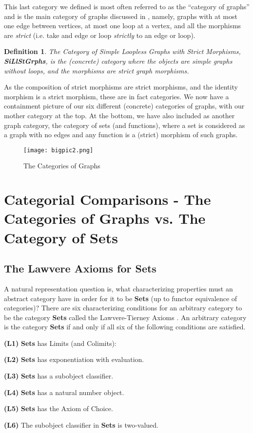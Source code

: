 \documentclass[11pt]{article}
\newtheorem{definition}[theorem]{Definition}
\begin{document}
\indent This last category we defined is most often referred to as the ``category of graphs'' and is the main category of graphs discussed in \cites{HN2004, Dochtermann}, namely, graphs with at most one edge between vertices, at most one loop at a vertex, and all the morphisms are \emph{strict} (i.e. take and edge or loop \emph{strictly} to an edge or loop).
\begin{definition}
The \emph{Category of Simple Loopless Graphs with Strict Morphisms}, \textbf{SiLlStGrphs}, is the (concrete) category where the objects are simple graphs without loops, and the morphisms are strict graph morphisms.
\end{definition}
As the composition of strict morphisms are strict morphisms, and the identity morphism is a strict morphism, these are in fact categories. We now have a containment picture of our six different (concrete) categories of graphs, with our mother category at the top. At the bottom, we have also included as another graph category, the category of sets (and functions), where a set is considered as a graph with no edges and any function is a (strict) morphism of such graphs.
\begin{figure}[h]
\centering \texttt{[image: bigpic2.png]}
\caption{The Categories of Graphs}
\end{figure}

\section[Categorial Comparisons - Graphs vs. Sets]{Categorial Comparisons - The Categories of Graphs vs. The Category of Sets}
\subsection{The Lawvere Axioms for \textbf{Sets}}
A natural representation question is, what characterizing properties must an abstract category have in order for it to be \textbf{Sets} (up to functor equivalence of categories)? There are six characterizing conditions for an arbitrary category to be the category \textbf{Sets} called the Lawvere-Tierney Axioms \cites{LT, Lawvere, T}. An arbitrary category is the category \textbf{Sets} if and only if all six of the following conditions are satisfied.\par
\begin{list}{}
\item \textbf{(L1)} \textbf{Sets} has Limits (and Colimits):
\item \textbf{(L2)} \textbf{Sets} has exponentiation with evaluation.
\item \textbf{(L3)} \textbf{Sets} has a subobject classifier.
\item \textbf{(L4)} \textbf{Sets} has a natural number object.
\item \textbf{(L5)} \textbf{Sets} has the Axiom of Choice.
\item \textbf{(L6)} The subobject classifier in \textbf{Sets} is two-valued.
\end{list}
\end{document}

